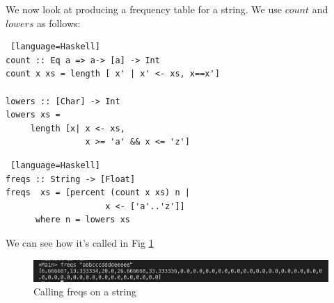 \documentclass[11pt]{article}
\def\frametitle#1{}
\begin{document}
\begin{frame}[fragile, label=freq2]
  \frametitle{Frequency Tables cont. } 
  We now look at producing a frequency table for a string. We use $count$ and $lowers$ as follows:
    \begin{onlyenv}
  \begin{lstlisting} [language=Haskell]
count :: Eq a => a-> [a] -> Int
count x xs = length [ x' | x' <- xs, x==x'] 

lowers :: [Char] -> Int
lowers xs = 
     length [x| x <- xs, 
                x >= 'a' && x <= 'z'] 
\end{lstlisting}
 \end{onlyenv}    
\end{frame}


\begin{frame}[fragile, label=freq3]
  \frametitle{Frequency Tables cont. } 
     \begin{onlyenv}
  \begin{lstlisting} [language=Haskell]
freqs :: String -> [Float]
freqs  xs = [percent (count x xs) n | 
                    x <- ['a'..'z']]
      where n = lowers xs
\end{lstlisting}
 \end{onlyenv}    
\pagebreak
  We can see how it's called in Fig \ref{freqs}
  \begin{figure}
			\centering
			\includegraphics[page=1,width=.9\textwidth]{img/03.png}
			\caption{Calling freqs on a string}
			\label{freqs}
		\end{figure}
\end{frame}
\end{document}
